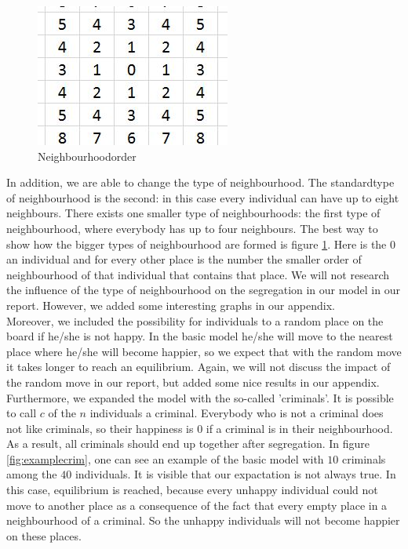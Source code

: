 
\begin{figure}
\vspace{-20pt}
\centering
\includegraphics[scale=0.5]{buurtorde.jpg}
\caption{Neighbourhoodorder}
\vspace{-15pt}
\label{fig:neighbourhood}
\end{figure}

In addition, we are able to change the type of neighbourhood.
The standardtype of neighbourhood is the second: in this case every individual can have up to eight neighbours.
There exists one smaller type of neighbourhoods: the first type of neighbourhood, where everybody has up to four neighbours.
The best way to show how the bigger types of neighbourhood are formed is figure \ref{fig:neighbourhood}.
Here is the $0$ an individual and for every other place is the number the smaller order of neighbourhood of that individual that contains that place.
We will not research the influence of the type of neighbourhood on the segregation in our model in our report.
However, we added some interesting graphs in our appendix.\\

Moreover, we included the possibility for individuals to a random place on the board if he/she is not happy.
In the basic model he/she will move to the nearest place where he/she will become happier, so we expect that with the random move it takes longer to reach an equilibrium.
Again, we will not discuss the impact of the random move in our report, but added some nice results in our appendix.\\

Furthermore, we expanded the model with the so-called 'criminals'.
It is possible to call $c$ of the $n$ individuals a criminal.
Everybody who is not a criminal does not like criminals, so their happiness is $0$ if a criminal is in their neighbourhood.
As a result, all criminals should end up together after segregation.
In figure \ref{fig:examplecrim}, one can see an example of the basic model with $10$ criminals among the $40$ individuals.
It is visible that our expactation is not always true.
In this case, equilibrium is reached, because every unhappy individual could not move to another place as a consequence of the fact that every empty place in a neighbourhood of a criminal.
So the unhappy individuals will not become happier on these places.

